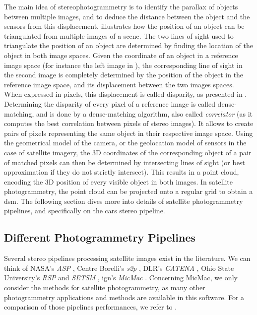 The main idea of stereophotogrammetry is to identify the parallax of objects between multiple images, and to deduce the distance between the object and the sensors from this displacement.  illustrates how the position of an object can be triangulated from multiple images of a scene. The two lines of sight used to triangulate the position of an object are determined by finding the location of the object in both image spaces. Given the coordinate of an object in a reference image space (for instance the left image in ), the corresponding line of sight in the second image is completely determined by the position of the object in the reference image space, and its displacement between the two images spaces. When expressed in pixels, this displacement is called disparity, as presented in . Determining the disparity of every pixel of a reference image is called dense-matching, and is done by a dense-matching algorithm, also called \textit{correlator} (as it computes the best correlation between pixels of stereo images). It allows to create pairs of pixels representing the same object in their respective image space. Using the geometrical model of the camera, or the geolocation model of sensors in the case of satellite imagery, the 3D coordinates of the corresponding object of a pair of matched pixels can then be determined by intersecting lines of sight (or best approximation if they do not strictly intersect). This results in a point cloud, encoding the 3D position of every visible object in both images. In satellite photogrammetry, the point cloud can be projected onto a regular grid to obtain a \acrshort{dsm}. The following section dives more into details of satellite photogrammetry pipelines, and specifically on the \acrshort{cars} stereo pipeline.

\subsection{Different Photogrammetry Pipelines}\label{sec:different_photogrammetry_pipelines}
Several stereo pipelines processing satellite images exist in the literature. We can think of NASA's \textit{ASP} \cite{shean_automated_2016}, Centre Borelli's \textit{s2p} \cite{franchis_automatic_2014}, DLR's \textit{CATENA} \cite{kraus_fully_2013}, Ohio State University's \textit{RSP} and \textit{SETSM} \cite{qin_rpc_2016, noh_surface_2017}, \acrshort{ign}'s \textit{MicMac} \cite{rupnik_micmac_2017}. Concerning MicMac, we only consider the methods for satellite photogrammetry, as many other photogrammetry applications and methods are available in this software. For a comparison of those pipelines performances, we refer to \cite{bosch_metric_2017,qin_quality_2021}.

